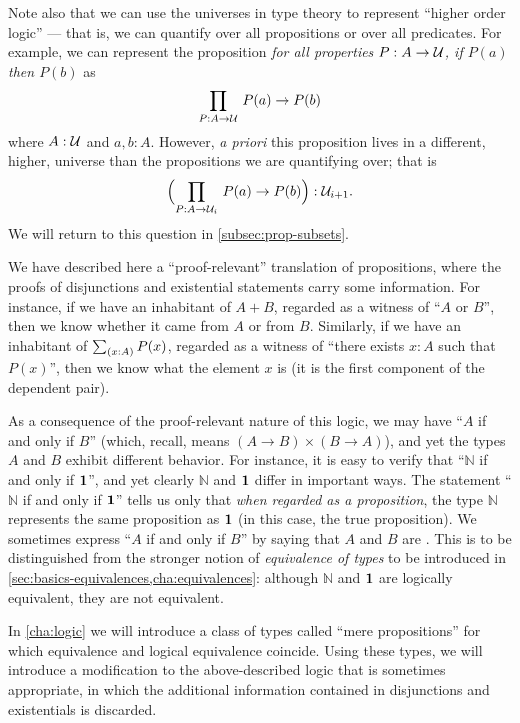 Note also that we can use the universes in type theory to represent ``higher order logic'' --- that is, we can quantify over all propositions or over all predicates.
For example, we can represent the proposition \emph{for all properties $P : A \to \mathcal{U}$, if $P(a)$ then $P(b)$} as
\[ \prd{P : A \to \UU} P(a) \to P(b) \]
where $A : \mathcal{U}$ and $a,b : A$.
However, \emph{a priori} this proposition lives in a different, higher, universe than the
propositions we are quantifying over; that is
\[ \Parens{\prd{P : A \to \UU_i} P(a) \to P(b)} : \UU_{i+1}. \]
We will return to this question in \autoref{subsec:prop-subsets}.

\mentalpause

We have described here a ``proof-relevant''
%
translation of propositions, where the proofs of disjunctions and existential statements carry some information.
For instance, if we have an inhabitant of $A+B$, regarded as a witness of ``$A$ or $B$'', then we know whether it came from $A$ or from $B$.
Similarly, if we have an inhabitant of $\sm{x:A} P(x)$, regarded as a witness of ``there exists $x:A$ such that $P(x)$'', then we know what the element $x$ is (it is the first component of the dependent pair).

As a consequence of the proof-relevant nature of this logic, we may have ``$A$ if and only if $B$'' (which, recall, means $(A\to B)\times (B\to A)$), and yet the types $A$ and $B$ exhibit different behavior.
For instance, it is easy to verify that ``$\mathbb{N}$ if and only if $\mathbf{1}$'', and yet clearly $\mathbb{N}$ and $\mathbf{1}$ differ in important ways.
The statement ``$\mathbb{N}$ if and only if $\mathbf{1}$'' tells us only that \emph{when regarded as a proposition}, the type $\mathbb{N}$ represents the same proposition as $\mathbf{1}$ (in this case, the true proposition).
We sometimes express ``$A$ if and only if $B$'' by saying that $A$ and $B$ are .
%
%
This is to be distinguished from the stronger notion of \emph{equivalence of types} to be introduced in \autoref{sec:basics-equivalences,cha:equivalences}:
although $\mathbb{N}$ and $\mathbf{1}$ are logically equivalent, they are not equivalent.

In \autoref{cha:logic} we will introduce a class of types called ``mere propositions'' for which equivalence and logical equivalence coincide.
Using these types, we will introduce a modification to the above-described logic that is sometimes appropriate, in which the additional information contained in disjunctions and existentials is discarded.

